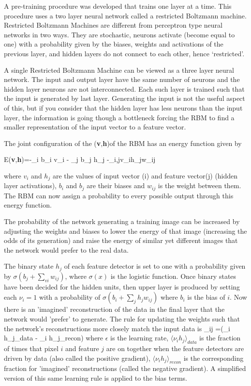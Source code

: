 A pre-training procedure was developed that trains one layer at a time.
This procedure uses a two layer neural network called a restricted Boltzmann machine\citep{hinton2006reducing}\citep{ackley1985learning}\citep{hinton2010practical}.
Restricted Boltzmann Machines are different from perceptron type neural networks in two ways.
They are stochastic, neurons activate (become equal to one) with a probability given by the biases, weights and activations of the previous layer, and hidden layers do not connect to each other, hence `restricted'.

A single Restricted Boltzmann Machine can be viewed as a three layer neural network.
The input and output layer have the same number of neurons and the hidden layer neurons are not interconnected.
Each such layer is trained such that the input is generated by last layer.
Generating the input is not the useful aspect of this, but if you consider that the hidden layer has less neurons than the input layer, the information is going though a bottleneck forcing the RBM to find a smaller representation of the input vector to a feature vector.

The joint configuration of the (\textbf{v},\textbf{h})of the RBM has an energy function\citep{hinton2006reducing} given by

\be
E(\textbf{v},\textbf{h})=-\sum_i b_i v_i - \sum_j b_j h_j -\sum_{i,j}v_ih_jw_{ij}
\ee

where $v_i$ and $h_j$ are the values of input vector (i) and feature vector(j) (hidden layer activations), $b_i$ and $b_j$ are their biases and $w_{ij}$ is the weight between them.
The RBM can now assign a probability to every possible output through this energy function.

The probability of the network generating a training image can be increased by adjusting the weights and biases to lower the energy of that image (increasing the odds of its generation) and raise the energy of similar yet different images that the network would prefer to the real data\citep{hinton2006reducing}.


The binary state $h_j$ of each feature detector is set to one with a probability given by $\sigma (b_j+\sum_{vi} w_{ij})$, where $\sigma(x)$ is the logistic function.
Once binary states have been decided for the hidden units, then upper layer is produced by setting each $\nu_i=1$ with a  probability of $\sigma (b_i+\sum_j h_j w_{ij})$ where $b_i$ is the bias of $i$.
Now there is an 'imagined' reconstruction of the data in the final layer that the network would 'prefer' to generate.
The rule for updating the weights such that the network's reconstructions more closely match the input data is\citep{hinton2006reducing}
\be
\Delta \omega_{ij} =\epsilon (\langle\nu_i h_j\rangle_{data} - \langle\nu_i h_j\rangle_{recon})
\ee
where $\epsilon$ is the learning rate, $\langle \nu_i h_j\rangle_{data}$ is the fraction of times that pixel $i$ and feature $j$ are on together when the feature detectors are driven by data (also called the positive gradient), $\langle \nu_i h_j \rangle_{recon}$ is the corresponding fraction for 'imagined' reconstructions (called the negative gradient).
A simplified version of this same learning rule is applied to the bias terms.


